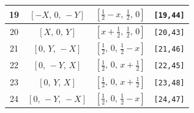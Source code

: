 \documentclass[fleqn,8pt]{jsarticle}
\begin{document}
\begin{longtable}{cccc}
19 & $\left[ - X,\, 0,\, - Y \right]$ & $\left[ \frac{1}{2} - x,\, \frac{1}{2},\, 0 \right]$ & {\tt [19,44]} \\ \hline
20 & $\left[ X,\, 0,\, Y \right]$ & $\left[ x + \frac{1}{2},\, \frac{1}{2},\, 0 \right]$ & {\tt [20,43]} \\ \hline
21 & $\left[ 0,\, Y,\, - X \right]$ & $\left[ \frac{1}{2},\, 0,\, \frac{1}{2} - x \right]$ & {\tt [21,46]} \\ \hline
22 & $\left[ 0,\, - Y,\, X \right]$ & $\left[ \frac{1}{2},\, 0,\, x + \frac{1}{2} \right]$ & {\tt [22,45]} \\ \hline
23 & $\left[ 0,\, Y,\, X \right]$ & $\left[ \frac{1}{2},\, 0,\, x + \frac{1}{2} \right]$ & {\tt [23,48]} \\ \hline
24 & $\left[ 0,\, - Y,\, - X \right]$ & $\left[ \frac{1}{2},\, 0,\, \frac{1}{2} - x \right]$ & {\tt [24,47]} \\
\end{longtable}
\renewcommand{\arraystretch}{1.2}
\end{document}
